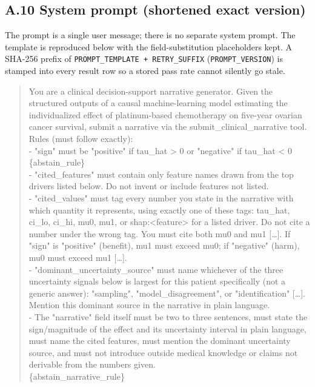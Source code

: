 \subsection*{A.10 System prompt (shortened exact version)}

The prompt is a single user message; there is no separate system prompt. The
template is reproduced below with the field-substitution placeholders
kept. A SHA-256 prefix of \texttt{PROMPT\_TEMPLATE + RETRY\_SUFFIX}
(\texttt{PROMPT\_VERSION}) is stamped into every result row so a stored pass
rate cannot silently go stale.

\begin{quote}\small\ttfamily\raggedright
You are a clinical decision-support narrative generator. Given the structured
outputs of a causal machine-learning model estimating the individualized effect
of platinum-based chemotherapy on five-year ovarian cancer survival, submit a
narrative via the submit\_clinical\_narrative tool.\\[4pt]
Rules (must follow exactly):\\
- "sign" must be "positive" if tau\_hat > 0 or "negative" if tau\_hat < 0
\{abstain\_rule\}\\
- "cited\_features" must contain only feature names drawn from the top drivers
listed below. Do not invent or include features not listed.\\
- "cited\_values" must tag every number you state in the narrative with which
quantity it represents, using exactly one of these tags: tau\_hat, ci\_lo,
ci\_hi, mu0, mu1, or shap:<feature> for a listed driver. Do not cite a number
under the wrong tag. You must cite both mu0 and mu1 [\dots]. If "sign" is
"positive" (benefit), mu1 must exceed mu0; if "negative" (harm), mu0 must
exceed mu1 [\dots].\\
- "dominant\_uncertainty\_source" must name whichever of the three uncertainty
signals below is largest for this patient specifically (not a generic answer):
"sampling", "model\_disagreement", or "identification" [\dots]. Mention this
dominant source in the narrative in plain language.\\
- The "narrative" field itself must be two to three sentences, must state the
sign/magnitude of the effect and its uncertainty interval in plain language,
must name the cited features, must mention the dominant uncertainty source, and
must not introduce outside medical knowledge or claims not derivable from the
numbers given.\\
\{abstain\_narrative\_rule\}\\[4pt]

\end{quote}

